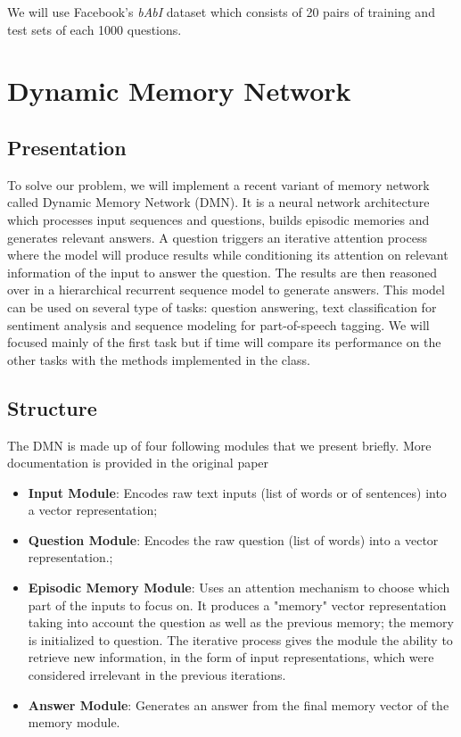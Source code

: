 \documentclass[submit]{harvardml}
\begin{document}
We will use Facebook's \emph{bAbI} dataset which consists of 20 pairs of training and test sets of each 1000 questions.

\section{Dynamic Memory Network}

\subsection{Presentation}
To solve our problem, we will implement a recent variant of memory network \cite{memnn} called Dynamic Memory Network (DMN). It is a neural network architecture which processes input sequences and questions, builds episodic memories and generates relevant answers. A question triggers an iterative attention process where the model will produce results while conditioning its attention on relevant information of the input to answer the question. The results are then reasoned over in a hierarchical recurrent sequence model to generate answers. This model can be used on several type of tasks: question answering, text classification for sentiment analysis  and sequence modeling for part-of-speech tagging. We will focused mainly of the first task but if time will compare its performance on the other tasks with the methods implemented in the class.

\subsection{Structure}

The DMN is made up of four following modules that we present briefly. More documentation is provided in the original paper \cite{dmn}

\begin{itemize}
	\item \textbf{Input Module}: Encodes raw text inputs (list of words or of sentences) into a vector representation;
	\item \textbf{Question Module}: Encodes the raw question (list of words) into a vector representation.;
	\item \textbf{Episodic Memory Module}: Uses an attention mechanism to choose which part of the inputs to focus on. It produces a "memory" vector representation taking into account the question as well as the previous memory; the memory is initialized to question. The iterative process gives the module the ability to retrieve new information, in the form of input representations, which were considered irrelevant in the previous iterations.
	\item \textbf{Answer Module}: Generates an answer from the final memory vector of the memory module.
\end{itemize}
\end{document}
